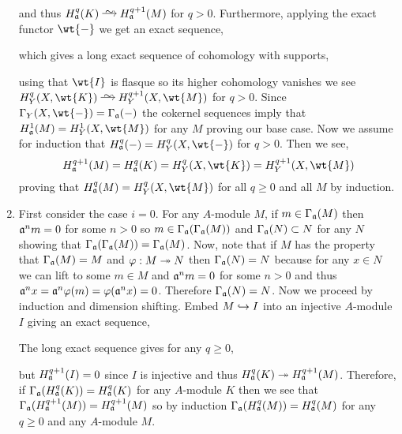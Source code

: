 \documentclass[12pt]{article}
\begin{document}
\begin{enumerate}
and thus $H^q_\a(K) \iso H^{q+1}_\a(M)$ for $q > 0$. Furthermore, applying the exact functor $\wt{-}$ we get an exact sequence,
\begin{center}
\end{center}
which gives a long exact sequence of cohomology with supports,
\begin{center}
\end{center}
using that $\wt{I}$ is flasque so its higher cohomology vanishes we see $H^q_Y(X, \wt{K}) \iso H^{q+1}_Y(X, \wt{M})$ for $q > 0$. Since $\Gamma_Y(X, \wt{-}) = \Gamma_\a(-)$ the cokernel sequences imply that $H^1_\a(M) = H^1_Y(X, \wt{M})$ for any $M$ proving our base case.
Now we assume for induction that $H^q_\a(-) = H^q_Y(X, \wt{-})$ for $q > 0$. Then we see,
\[ H^{q+1}_\a(M) = H^q_\a(K) = H^q_Y(X, \wt{K}) = H^{q+1}_Y(X, \wt{M}) \]
proving that $H^q_\a(M) = H^q_Y(X, \wt{M})$ for all $q \ge 0$ and all $M$ by induction.

\item First consider the case $i = 0$. For any $A$-module $M$, if $m \in \Gamma_{\mathfrak{a}}(M)$ then $\mathfrak{a}^n m = 0$ for some $n > 0$ so $m \in \Gamma_{\mathfrak{a}}(\Gamma_{\mathfrak{a}}(M))$ and $\Gamma_{\mathfrak{a}}(N) \subset N$ for any $N$ showing that $\Gamma_{\mathfrak{a}}(\Gamma_{\mathfrak{a}}(M)) = \Gamma_{\mathfrak{a}}(M)$. Now, note that if $M$ has the property that $\Gamma_{\mathfrak{a}}(M) = M$ and $\varphi : M \twoheadrightarrow N$ then $\Gamma_{\mathfrak{a}}(N) = N$ because for any $x \in N$ we can lift to some $m \in M$ and $\mathfrak{a}^n m = 0$ for some $n > 0$ and thus $\mathfrak{a}^n x = \mathfrak{a}^n \varphi(m)= \varphi(\mathfrak{a}^n x) = 0$. Therefore $\Gamma_{\mathfrak{a}}(N) = N$. Now we proceed by induction and dimension shifting. Embed $M \hookrightarrow I$ into an injective $A$-module $I$ giving an exact sequence,
\begin{center}
\end{center}
The long exact sequence gives for any $q \ge 0$,
\begin{center}
\end{center}
but $H^{q+1}_{\mathfrak{a}}(I) = 0$ since $I$ is injective and thus $H^q_{\mathfrak{a}}(K) \twoheadrightarrow H^{q+1}_{\mathfrak{a}}(M)$. Therefore, if $\Gamma_{\mathfrak{a}}(H^q_{\mathfrak{a}}(K)) = H^q_{\mathfrak{a}}(K)$ for any $A$-module $K$ then we see that $\Gamma_{\mathfrak{a}}(H^{q+1}_{\mathfrak{a}}(M)) = H^{q+1}_{\mathfrak{a}}(M)$ so by induction $\Gamma_{\mathfrak{a}}(H^{q}_{\mathfrak{a}}(M)) = H^q_{\mathfrak{a}}(M)$ for any $q \ge 0$ and any $A$-module $M$.
\end{enumerate}
\end{document}
